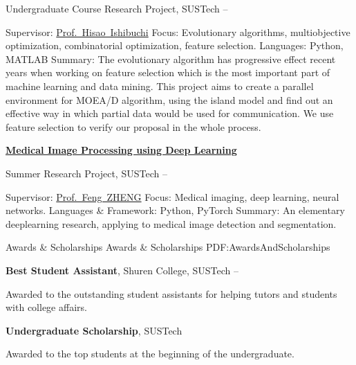 \documentclass[a4paper,MMMyyyy,nonstopmode]{simpleresumecv}
\begin{document}
\begin{Body}
\BulletItem
Undergraduate Course Research Project, SUSTech
\hfill
{} --
\begin{Detail}
\SubBulletItem
Supervisor:
\href{http://cse.sustech.edu.cn/faculty/~hisao/}{Prof.~Hisao~Ishibuchi}
\SubBulletItem
Focus:
Evolutionary algorithms, multiobjective optimization, combinatorial optimization, feature selection.
\SubBulletItem
Languages: Python, MATLAB
\SubBulletItem
Summary:
The evolutionary algorithm has progressive effect recent years when working on feature selection which is the most important part of machine learning and data mining. This project aims to create a parallel environment for MOEA/D algorithm, using the island model and find out an effective way in which partial data would be used for communication. We use feature selection to verify our proposal in the whole process.
\end{Detail}

\Gap
\Entry
\href{https://github.com/hackroid/cv-xmp}
{\textbf{Medical Image Processing using Deep Learning}}

\BulletItem
Summer Research Project, SUSTech
\hfill
{} --
\begin{Detail}
\SubBulletItem
Supervisor:
\href{https://faculty.sustech.edu.cn/fengzheng/en/}{Prof.~Feng~ZHENG}
\SubBulletItem
Focus:
Medical imaging, deep learning, neural networks.
\SubBulletItem
Languages \& Framework: Python, PyTorch
\SubBulletItem
Summary:
An elementary deeplearning research, applying to medical image detection and segmentation.
\end{Detail}



\Section
{Awards \&\newline
Scholarships}
{Awards \& Scholarships}
{PDF:AwardsAndScholarships}

\BulletItem
\textbf{Best Student Assistant},
Shuren College,
SUSTech
\hfill
{} --
\begin{Detail}
\Item
Awarded to the outstanding student assistants for helping tutors and students with college affairs.
\end{Detail}

\Gap
\BulletItem
\textbf{Undergraduate Scholarship},
SUSTech
\hfill
{}
\begin{Detail}
\Item
Awarded to the top students at the beginning of the undergraduate.
\end{Detail}



\end{Body}
\end{document}
